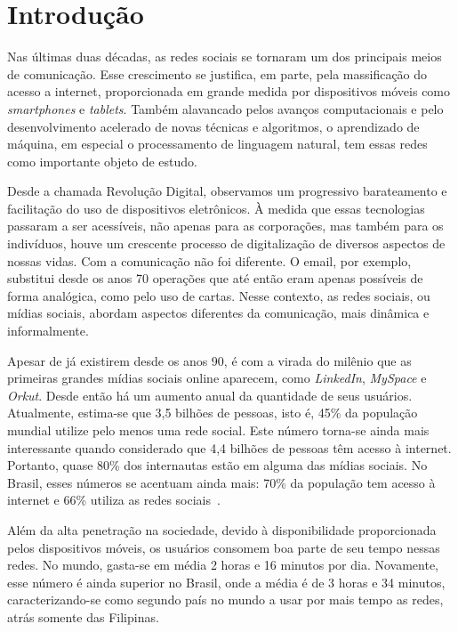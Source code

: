 \chapter{Introdução}
\label{chapter:intro}

Nas últimas duas décadas, as redes sociais se tornaram um dos principais meios de
comunicação.
Esse crescimento se justifica, em parte, pela massificação do acesso a internet,
proporcionada em grande medida por dispositivos móveis como \textit{smartphones}
e \textit{tablets}.
Também alavancado pelos avanços computacionais e pelo desenvolvimento acelerado
de novas técnicas e algoritmos, o aprendizado de máquina, em especial o
processamento de linguagem natural, tem essas redes como importante objeto de
estudo.

Desde a chamada Revolução Digital, observamos um progressivo barateamento e
facilitação do uso de dispositivos eletrônicos.
À medida que essas tecnologias passaram a ser acessíveis, não apenas para as
corporações, mas também para os indivíduos, houve um crescente processo de
digitalização de diversos aspectos de nossas vidas.
Com a comunicação não foi diferente.
O email, por exemplo, substitui desde os anos 70 operações que até então eram
apenas possíveis de forma analógica, como pelo uso de cartas.
Nesse contexto, as redes sociais, ou mídias sociais, abordam aspectos diferentes
da comunicação, mais dinâmica e informalmente.

Apesar de já existirem desde os anos 90, é com a virada do milênio que as
primeiras grandes mídias sociais online aparecem, como \textit{LinkedIn},
\textit{MySpace} e \textit{Orkut}.
Desde então há um aumento anual da quantidade de seus usuários.
Atualmente, estima-se que 3,5 bilhões de pessoas, isto é, 45\% da população mundial
utilize pelo menos uma rede social.
Este número torna-se ainda mais interessante quando considerado que 4,4 bilhões
de pessoas têm acesso à internet.
Portanto, quase 80\% dos internautas estão em alguma das mídias sociais.
No Brasil, esses números se acentuam ainda mais: 70\% da população tem
acesso à internet e 66\% utiliza as redes sociais~\cite{social19}.

Além da alta penetração na sociedade, devido à disponibilidade proporcionada
pelos dispositivos móveis, os usuários consomem boa parte de seu tempo nessas
redes.
No mundo, gasta-se em média 2 horas e 16 minutos por dia.
Novamente, esse número é ainda superior no Brasil, onde a média é de 3 horas e
34 minutos, caracterizando-se como segundo país no mundo a usar por mais tempo
as redes, atrás somente das Filipinas.

